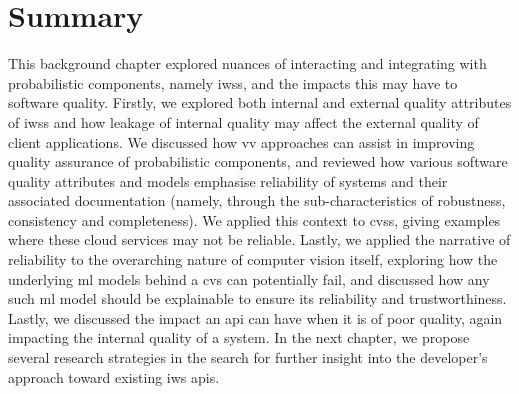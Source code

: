



\section{Summary}

This background chapter explored nuances of interacting and integrating with probabilistic components, namely \glspl{iws}, and the impacts this may have to software quality. Firstly, we explored both internal and external quality attributes of \glspl{iws} and how leakage of internal quality may affect the external quality of client applications. We discussed how \gls{vv} approaches can assist in improving quality assurance of probabilistic components, and reviewed how various software quality attributes and models emphasise reliability of systems and their associated documentation (namely, through the sub-characteristics of robustness, consistency and completeness). We applied this context to \glspl{cvs}, giving examples where these cloud services may not be reliable. Lastly, we applied the narrative of reliability to the overarching nature of computer vision itself, exploring how the underlying \gls{ml} models behind a \gls{cvs} can potentially fail, and discussed how any such \gls{ml} model should be explainable to ensure its reliability and trustworthiness. Lastly, we discussed the impact an \gls{api} can have when it is of poor quality, again impacting the internal quality of a system. In the next chapter, we propose several research strategies in the search for further insight into the developer's approach toward existing \gls{iws} \glspl{api}.
